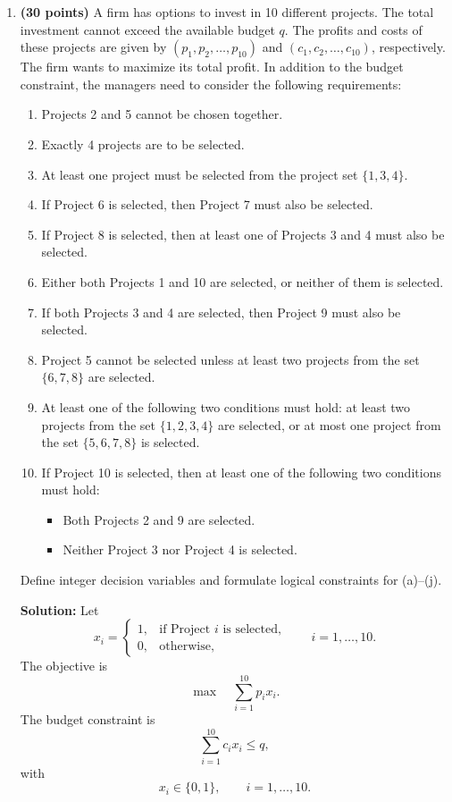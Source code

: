\documentclass[11pt]{article}
\begin{document}
\begin{enumerate}
\item \textbf{(30 points)} A firm has options to invest in 10 different projects. The total investment cannot exceed the available budget $q$. The profits and costs of these projects are given by $(p_1,p_2,\ldots,p_{10})$ and $(c_1,c_2,\ldots,c_{10})$, respectively. The firm wants to maximize its total profit. In addition to the budget constraint, the managers need to consider the following requirements:
\begin{enumerate}
    \item[(a)] Projects 2 and 5 cannot be chosen together.
    \item[(b)] Exactly 4 projects are to be selected.
    \item[(c)] At least one project must be selected from the project set $\{1,3,4\}$.
    \item[(d)] If Project 6 is selected, then Project 7 must also be selected.
    \item[(e)] If Project 8 is selected, then at least one of Projects 3 and 4 must also be selected.
    \item[(f)] Either both Projects 1 and 10 are selected, or neither of them is selected.
    \item[(g)] If both Projects 3 and 4 are selected, then Project 9 must also be selected.
    \item[(h)] Project 5 cannot be selected unless at least two projects from the set $\{6,7,8\}$ are selected.
    \item[(i)] At least one of the following two conditions must hold: at least two projects from the set $\{1,2,3,4\}$ are selected, or at most one project from the set $\{5,6,7,8\}$ is selected.
    \item[(j)] If Project 10 is selected, then at least one of the following two conditions must hold:
    \begin{itemize}
        \item Both Projects 2 and 9 are selected.
        \item Neither Project 3 nor Project 4 is selected.
    \end{itemize}
\end{enumerate}
Define integer decision variables and formulate logical constraints for (a)--(j).

{\color{red}
\textbf{Solution:}
Let
\[
x_i=
\begin{cases}
1, & \text{if Project }i\text{ is selected,}\\
0, & \text{otherwise,}
\end{cases}
\qquad i=1,\ldots,10.
\]
The objective is
\[
\max \quad \sum_{i=1}^{10}p_ix_i.
\]
The budget constraint is
\[
\sum_{i=1}^{10}c_ix_i\leq q,
\]
with
\[
x_i\in\{0,1\},\qquad i=1,\ldots,10.
\]

}
\end{enumerate}
\end{document}

